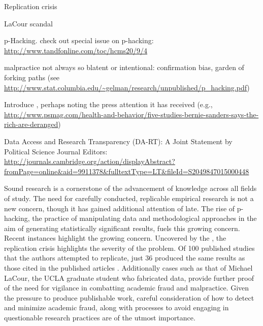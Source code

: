 
Replication crisis

LaCour scandal

p-Hacking.  check out special issue on p-hacking: \url{http://www.tandfonline.com/toc/hcms20/9/4}

malpractice not always so blatent or intentional: confirmation bias, garden of forking paths (see \url{http://www.stat.columbia.edu/~gelman/research/unpublished/p_hacking.pdf})

Introduce \citet{Newman2015}, perhaps noting the press attention it has received (e.g., \url{http://www.psmag.com/health-and-behavior/five-studies-bernie-sanders-says-the-rich-are-deranged})

Data Access and Research Transparency (DA-RT): A Joint Statement by Political Science Journal Editors: \url{http://journals.cambridge.org/action/displayAbstract?fromPage=online&aid=9911378&fulltextType=LT&fileId=S2049847015000448}

Sound research is a cornerstone of the advancement of knowledge across all fields of study. The need for carefully conducted, replicable empirical research is not a new concern, though it has gained additional attention of late. The rise of p-hacking, the practice of manipulating data and methodological approaches in the aim of generating statistically significant results, fuels this growing concern. Recent instances highlight the growing concern. Uncovered by the \citet{OpenScienceCollaboration2015}, the replication crisis highlights the severity of the problem. Of 100 published studies that the authors attempted to replicate, just 36 produced the same results as those cited in the published articles \citep{OpenScienceCollaboration2015}. Additionally cases such as that of Michael LaCour, the UCLA graduate student who fabricated data, provide further proof of the need for vigilance in combatting academic fraud and malpractice. Given the pressure to produce publishable work, careful consideration of how to detect and minimize academic fraud, along with processes to avoid engaging in questionable research practices are of the utmost importance.

